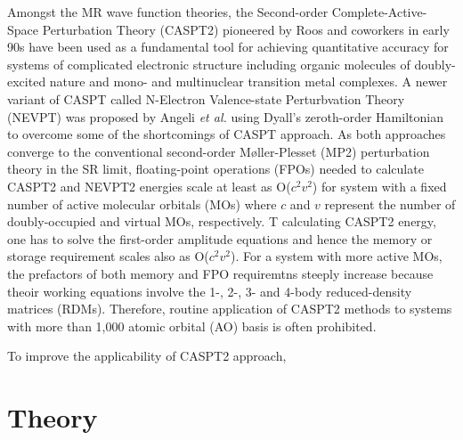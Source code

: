 \documentclass[aip,jcp,amsmath,twocolumn,floatfix,reprint,fleqn]{revtex4-1}
\begin{document}
%
%
%
Amongst the MR wave function theories, the Second-order Complete-Active-Space Perturbation Theory (CASPT2) pioneered by Roos and coworkers\cite{doi:10.1021/j100377a012,doi:10.1063/1.462209} in early 90s have been used as a fundamental tool for achieving quantitative accuracy for systems of complicated electronic structure including organic molecules of doubly-excited nature\cite{doi:10.1063/1.2889385} and mono-\cite{doi:10.1021/ct900567c,doi:10.1021/acs.jctc.9b00166} and multinuclear\cite{Cramer2008,doi:10.1002/chem.201902766} transition metal complexes.
%
A newer variant of CASPT called N-Electron Valence-state Perturbvation Theory (NEVPT) was proposed by Angeli {\it et al.}\cite{angeliintroduction2001,angelin-electron2002,angelinew2006} using Dyall's zeroth-order Hamiltonian\cite{dyallthe1995} to overcome some of the shortcomings of CASPT approach.
%
As both approaches converge to the conventional second-order M\o ller-Plesset (MP2) perturbation theory\cite{MP2} in the SR limit, floating-point operations (FPOs) needed to calculate CASPT2 and NEVPT2 energies scale at least as O($c^2v^2$) for system with a fixed number of active molecular orbitals (MOs) where $c$ and $v$ represent the number of doubly-occupied and virtual MOs, respectively.
%
T calculating CASPT2 energy, one has to solve the first-order amplitude equations and hence the memory or storage requirement scales also as O($c^2v^2$).
%
For a system with more active MOs, the prefactors of both memory and FPO requiremtns steeply increase because theoir working equations involve the 1-, 2-, 3- and 4-body reduced-density matrices (RDMs).
%
Therefore, routine application of CASPT2 methods to systems with more than 1,000 atomic orbital (AO) basis is often prohibited.

%
To improve the applicability of CASPT2 approach, 


\section{Theory}\label{Sec:theory}
\end{document}
